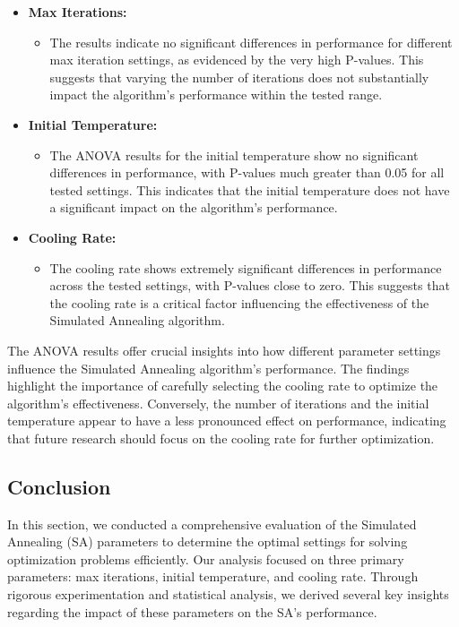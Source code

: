 \documentclass{article}
\begin{document}
    \begin{itemize}
        \item \textbf{Max Iterations:}
        \begin{itemize}
            \item The results indicate no significant differences in performance for different max iteration settings, as evidenced by the very high P-values. This suggests that varying the number of iterations does not substantially impact the algorithm's performance within the tested range.
        \end{itemize}
        \item \textbf{Initial Temperature:}
        \begin{itemize}
            \item The ANOVA results for the initial temperature show no significant differences in performance, with P-values much greater than 0.05 for all tested settings. This indicates that the initial temperature does not have a significant impact on the algorithm's performance.
        \end{itemize}
        \item \textbf{Cooling Rate:}
        \begin{itemize}
            \item The cooling rate shows extremely significant differences in performance across the tested settings, with P-values close to zero. This suggests that the cooling rate is a critical factor influencing the effectiveness of the Simulated Annealing algorithm.
        \end{itemize}
    \end{itemize}

    The ANOVA results offer crucial insights into how different parameter settings influence the Simulated Annealing algorithm's performance. The findings highlight the importance of carefully selecting the cooling rate to optimize the algorithm's effectiveness. Conversely, the number of iterations and the initial temperature appear to have a less pronounced effect on performance, indicating that future research should focus on the cooling rate for further optimization.

    \subsection{Conclusion}

    In this section, we conducted a comprehensive evaluation of the Simulated Annealing (SA) parameters to determine the optimal settings for solving optimization problems efficiently. Our analysis focused on three primary parameters: max iterations, initial temperature, and cooling rate. Through rigorous experimentation and statistical analysis, we derived several key insights regarding the impact of these parameters on the SA's performance.
\end{document}
